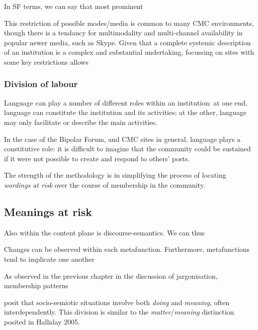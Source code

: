 In SF terms, we can say that most prominent

This restriction of possible modes\slash media is common to many CMC environments, though there is a tendancy for multimodality and multi-channel availability in popular newer media, such as Skype. Given that a complete systemic description of an institution is a complex and substantial undertaking, focussing on sites with some key restrictions allows 

\subsubsection{Division of labour}
Language can play a number of different roles within an institution: at one end, language can constitute the institution and its activities; at the other, language may only facilitate or describe the main activities. %

In the case of the Bipolar Forum, and CMC sites in general, language plays a constitutive role: it is difficult to imagine that the community could be sustained if it were not possible to create and respond to others' posts.

The strength of the methodology is in simplifying the process of locating \emph{wordings at risk} over the course of membership in the community.

\subsection{Meanings at risk}

Also within the content plane is discourse-semantics. We can thus

Changes can be observed within each metafunction. Furthermore, metafunctions tend to implicate one another

As observed in the previous chapter in the discussion of jargonisation, membership patterns


\textcite{halliday_introduction_2004} posit that socio-semiotic situations involve both \emph{doing} and \emph{meaning}, often interdependently. This division is similar to the \emph{matter}\slash \emph{meaning} distinction posited in Halliday 2005.


